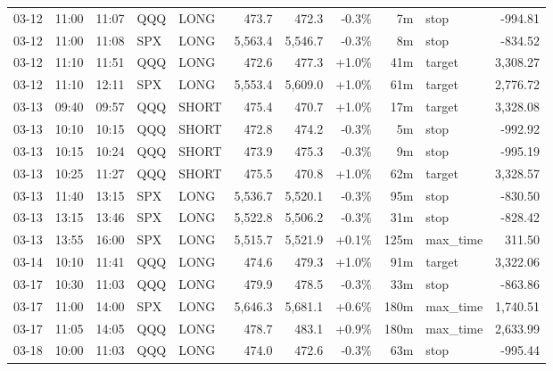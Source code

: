 \documentclass[11pt,a4paper,twoside]{article}
\begin{document}
\begin{center}
\begin{longtable}{>{\color{txtmain}}l l l l l r r r r >{\color{txtmain}}l r}
03-12 & 11:00 & 11:07 & QQQ & LONG & 473.7 & 472.3 & \textcolor{lossred}{-0.3\%} & 7m & stop & \textcolor{lossred}{-994.81} \\
03-12 & 11:00 & 11:08 & SPX & LONG & 5,563.4 & 5,546.7 & \textcolor{lossred}{-0.3\%} & 8m & stop & \textcolor{lossred}{-834.52} \\
03-12 & 11:10 & 11:51 & QQQ & LONG & 472.6 & 477.3 & \textcolor{wingreen}{+1.0\%} & 41m & target & \textcolor{wingreen}{3,308.27} \\
03-12 & 11:10 & 12:11 & SPX & LONG & 5,553.4 & 5,609.0 & \textcolor{wingreen}{+1.0\%} & 61m & target & \textcolor{wingreen}{2,776.72} \\
03-13 & 09:40 & 09:57 & QQQ & SHORT & 475.4 & 470.7 & \textcolor{wingreen}{+1.0\%} & 17m & target & \textcolor{wingreen}{3,328.08} \\
03-13 & 10:10 & 10:15 & QQQ & SHORT & 472.8 & 474.2 & \textcolor{lossred}{-0.3\%} & 5m & stop & \textcolor{lossred}{-992.92} \\
03-13 & 10:15 & 10:24 & QQQ & SHORT & 473.9 & 475.3 & \textcolor{lossred}{-0.3\%} & 9m & stop & \textcolor{lossred}{-995.19} \\
03-13 & 10:25 & 11:27 & QQQ & SHORT & 475.5 & 470.8 & \textcolor{wingreen}{+1.0\%} & 62m & target & \textcolor{wingreen}{3,328.57} \\
03-13 & 11:40 & 13:15 & SPX & LONG & 5,536.7 & 5,520.1 & \textcolor{lossred}{-0.3\%} & 95m & stop & \textcolor{lossred}{-830.50} \\
03-13 & 13:15 & 13:46 & SPX & LONG & 5,522.8 & 5,506.2 & \textcolor{lossred}{-0.3\%} & 31m & stop & \textcolor{lossred}{-828.42} \\
03-13 & 13:55 & 16:00 & SPX & LONG & 5,515.7 & 5,521.9 & \textcolor{wingreen}{+0.1\%} & 125m & max\_time & \textcolor{wingreen}{311.50} \\
03-14 & 10:10 & 11:41 & QQQ & LONG & 474.6 & 479.3 & \textcolor{wingreen}{+1.0\%} & 91m & target & \textcolor{wingreen}{3,322.06} \\
03-17 & 10:30 & 11:03 & QQQ & LONG & 479.9 & 478.5 & \textcolor{lossred}{-0.3\%} & 33m & stop & \textcolor{lossred}{-863.86} \\
03-17 & 11:00 & 14:00 & SPX & LONG & 5,646.3 & 5,681.1 & \textcolor{wingreen}{+0.6\%} & 180m & max\_time & \textcolor{wingreen}{1,740.51} \\
03-17 & 11:05 & 14:05 & QQQ & LONG & 478.7 & 483.1 & \textcolor{wingreen}{+0.9\%} & 180m & max\_time & \textcolor{wingreen}{2,633.99} \\
03-18 & 10:00 & 11:03 & QQQ & LONG & 474.0 & 472.6 & \textcolor{lossred}{-0.3\%} & 63m & stop & \textcolor{lossred}{-995.44} \\

\end{longtable}
\end{center}
\end{document}
